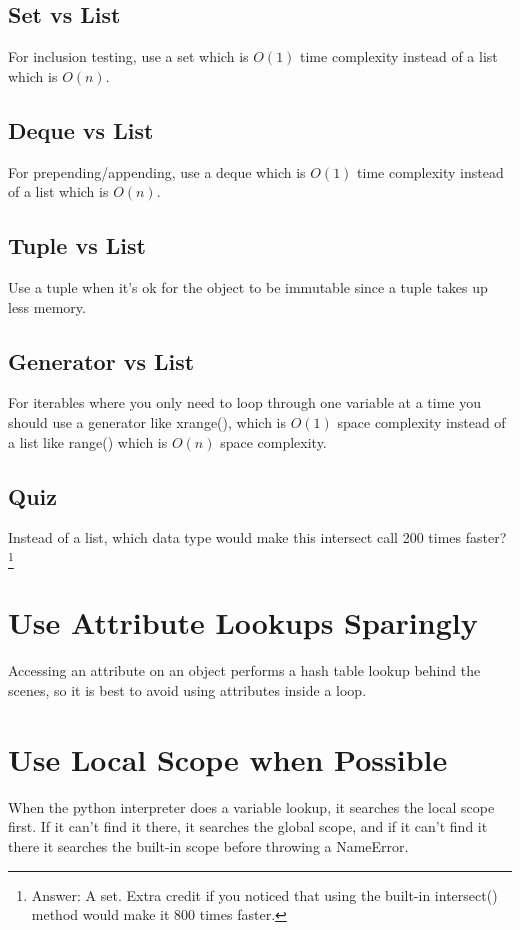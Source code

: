 \documentclass{article}
\begin{document}
\subsection{Set vs List}
For inclusion testing, use a set which is $O(1)$ time complexity
instead of a list which is $O(n)$.

\bigskip

\bigskip
\subsection{Deque vs List}
For prepending/appending, use a deque which is $O(1)$ time complexity
instead of a list which is $O(n)$.

\bigskip

\bigskip
\subsection{Tuple vs List}
Use a tuple when it's ok for the object to be immutable since a tuple
takes up less memory.

\bigskip

\bigskip
\subsection{Generator vs List}
For iterables where you only need to loop through one variable at a
time you should use a generator like xrange(), which is $O(1)$ space
complexity instead of a list like range() which is $O(n)$ space
complexity.

\bigskip

\bigskip
\subsection{Quiz}
Instead of a list, which data type would make this intersect call 200
times faster?\footnote{Answer: A set.  Extra credit if you noticed
  that using the built-in intersect() method would make it 800 times
  faster.}

\bigskip

\bigskip
\section{Use Attribute Lookups Sparingly}\label{sec:attr_lookups}
Accessing an attribute on an object performs a hash table lookup
behind the scenes, so it is best to avoid using attributes inside a
loop.

\bigskip

\bigskip
\section{Use Local Scope when Possible}\label{sec:scope}
When the python interpreter does a variable lookup, it searches the
local scope first.  If it can't find it there, it searches the global
scope, and if it can't find it there it searches the built-in scope
before throwing a NameError.
\end{document}
